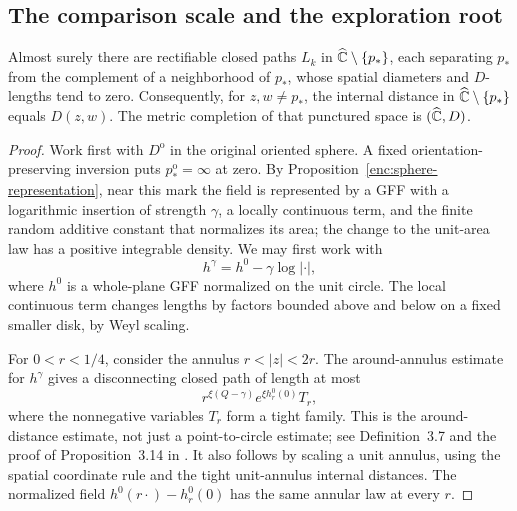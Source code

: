\subsection{The comparison scale and the exploration root}

\begin{lemma}
\label{comp:root-bypass}
Almost surely there are rectifiable closed paths $L_k$ in
$\widehat{\mathbb C}\setminus\{p_*\}$, each separating $p_*$ from the complement of
a neighborhood of $p_*$, whose spatial diameters and $D$-lengths tend
to zero.  Consequently, for $z,w\ne p_*$, the internal distance in
$\widehat{\mathbb C}\setminus\{p_*\}$ equals $D(z,w)$.  The metric completion of
that punctured space is $(\widehat{\mathbb C},D)$.
\end{lemma}

\begin{proof}
Work first with $D^{\mathrm o}$ in the original oriented sphere.
A fixed orientation-preserving inversion puts
$p_*^{\mathrm o}=\infty$ at zero.  By
Proposition~\ref{enc:sphere-representation}, near this mark the field
is represented by a GFF with a logarithmic insertion of strength
$\gamma$, a locally continuous term, and the finite random additive
constant that normalizes its area; the change to the unit-area law
has a positive integrable density.  We may first work with
\[
 h^\gamma=h^0-\gamma\log|\cdot|,
\]
where $h^0$ is a whole-plane GFF normalized on the unit circle.
The local continuous term changes lengths by factors bounded above
and below on a fixed smaller disk, by Weyl scaling.

For $0<r<1/4$, consider the annulus $r<|z|<2r$.  The
around-annulus estimate for $h^\gamma$ gives a disconnecting closed
path of length at most
\begin{equation}
 \label{comp:root-annulus-bound}
 r^{\xi(Q-\gamma)}e^{\xi h^0_r(0)}T_r,
\end{equation}
where the nonnegative variables $T_r$ form a tight family.  This is
the around-distance estimate, not just a point-to-circle estimate;
see Definition~3.7 and the proof of Proposition~3.14 in
\cite{DubedatEtAlWeakMetric}.  It also follows by scaling a unit annulus, using
the spatial coordinate rule and the tight unit-annulus internal
distances.  The normalized field
$h^0(r\cdot)-h^0_r(0)$ has the same annular law at every $r$.


\end{proof}
